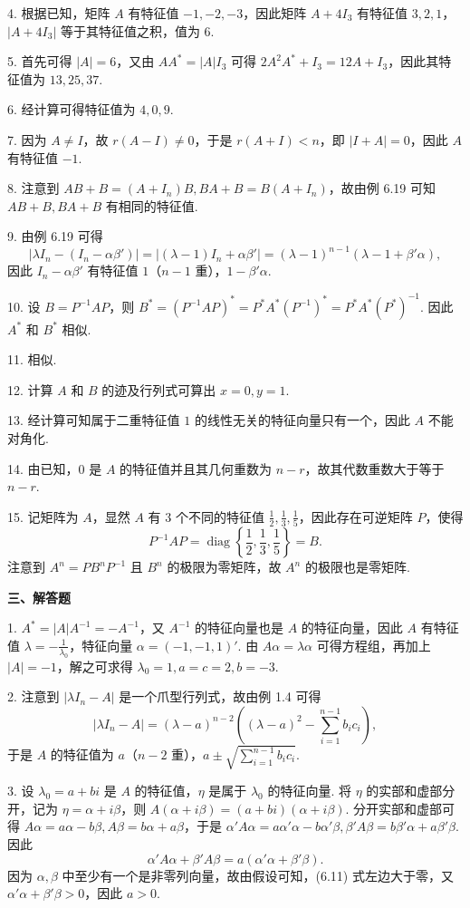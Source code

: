 \documentclass[UTF8, 12pt, fontset=fandol, oneside]{ctexart}
\begin{document}
4. 根据已知，矩阵 $A$ 有特征值 $-1,-2,-3$，因此矩阵 $A+4I_3$ 有特征值 $3,2,1$，$|A+4I_3|$ 等于其特征值之积，值为 $6$.

5. 首先可得 $|A|=6$，又由 $AA^*=|A|I_3$ 可得 $2A^2A^*+I_3=12A+I_3$，因此其特征值为 $13,25,37$.

6. 经计算可得特征值为 $4,0,9$.

7. 因为 $A\ne I$，故 $r(A-I)\ne 0$，于是 $r(A+I)<n$，即 $|I+A|=0$，因此 $A$ 有特征值 $-1$.

8. 注意到 $AB+B=(A+I_n)B,BA+B=B(A+I_n)$，故由例 6.19 可知 $AB+B,BA+B$ 有相同的特征值.

9. 由例 6.19 可得
\[
|\lambda I_n-(I_n-\alpha\beta')|=|(\lambda-1)I_n+\alpha\beta'|=(\lambda-1)^{n-1}(\lambda-1+\beta'\alpha),
\]
因此 $I_n-\alpha\beta'$ 有特征值 $1$（$n-1$ 重），$1-\beta'\alpha$.

10. 设 $B=P^{-1}AP$，则 $B^*=(P^{-1}AP)^*=P^*A^*(P^{-1})^*=P^*A^*(P^*)^{-1}$. 因此 $A^*$ 和 $B^*$ 相似.

11. 相似.

12. 计算 $A$ 和 $B$ 的迹及行列式可算出 $x=0,y=1$.

13. 经计算可知属于二重特征值 $1$ 的线性无关的特征向量只有一个，因此 $A$ 不能对角化.

14. 由已知，$0$ 是 $A$ 的特征值并且其几何重数为 $n-r$，故其代数重数大于等于 $n-r$.

15. 记矩阵为 $A$，显然 $A$ 有 $3$ 个不同的特征值 $\frac12,\frac13,\frac15$，因此存在可逆矩阵 $P$，使得
\[
P^{-1}AP=\operatorname{diag}\left\{\frac12,\frac13,\frac15\right\}=B.
\]
注意到 $A^n=PB^nP^{-1}$ 且 $B^n$ 的极限为零矩阵，故 $A^n$ 的极限也是零矩阵.

\noindent\textbf{三、解答题}

1. $A^*=|A|A^{-1}=-A^{-1}$，又 $A^{-1}$ 的特征向量也是 $A$ 的特征向量，因此 $A$ 有特征值 $\lambda=-\frac{1}{\lambda_0}$，特征向量 $\alpha=(-1,-1,1)'$. 由 $A\alpha=\lambda\alpha$ 可得方程组，再加上 $|A|=-1$，解之可求得 $\lambda_0=1,a=c=2,b=-3$.

2. 注意到 $|\lambda I_n-A|$ 是一个爪型行列式，故由例 1.4 可得
\[
|\lambda I_n-A|=(\lambda-a)^{n-2}\left((\lambda-a)^2-\sum_{i=1}^{n-1}b_ic_i\right),
\]
于是 $A$ 的特征值为 $a$（$n-2$ 重），$a\pm\sqrt{\sum_{i=1}^{n-1}b_ic_i}$.

3. 设 $\lambda_0=a+bi$ 是 $A$ 的特征值，$\eta$ 是属于 $\lambda_0$ 的特征向量. 将 $\eta$ 的实部和虚部分开，记为 $\eta=\alpha+i\beta$，则 $A(\alpha+i\beta)=(a+bi)(\alpha+i\beta)$. 分开实部和虚部可得 $A\alpha=a\alpha-b\beta,A\beta=b\alpha+a\beta$，于是 $\alpha'A\alpha=a\alpha'\alpha-b\alpha'\beta,\beta'A\beta=b\beta'\alpha+a\beta'\beta$. 因此
\begin{equation}
\alpha'A\alpha+\beta'A\beta=a(\alpha'\alpha+\beta'\beta). \tag{6.11}
\end{equation}
因为 $\alpha,\beta$ 中至少有一个是非零列向量，故由假设可知，(6.11) 式左边大于零，又 $\alpha'\alpha+\beta'\beta>0$，因此 $a>0$.
\end{document}
